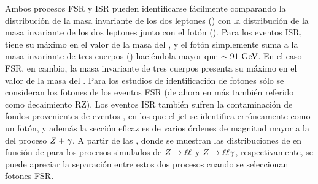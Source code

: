 Ambos procesos \ac{FSR} y \ac{ISR} pueden identificarse fácilmente comparando la distribución de la masa invariante de los dos leptones (\mll) con la distribución de la masa invariante de los dos leptones junto con el fot\'on (\mlly).
Para los eventos \ac{ISR}, \mll tiene su m\'aximo en el valor de la masa del \Zboson, y el fotón simplemente suma a la masa invariante de tres cuerpos (\mlly) haciéndola mayor que \(\sim 91~\text{GeV}\). En el caso \ac{FSR}, en cambio, la masa invariante de tres cuerpos \mlly presenta su m\'aximo en el valor de la masa del \Zboson.
Para los estudios de identificación de fotones sólo se consideran los fotones de los eventos \ac{FSR} (de ahora en m\'as también referido como decaimiento \acf{RZ}). Los eventos \ac{ISR} también sufren la contaminación de fondos provenientes de eventos \Zjets, en los que el jet se identifica erróneamente como un fotón, y adem\'as la sección eficaz \Zjets es de varios \'ordenes de magnitud mayor a la del proceso \(Z+\gamma\). A partir de las \Figs{\ref{fig:pid_ss:event_selection:mll_mlly_distribution:bkg}}{\ref{fig:pid_ss:event_selection:mll_mlly_distribution:signal}}, donde se muestran las distribuciones de \mll en funci\'on de \mlly para los procesos simulados de \(Z\rightarrow\ell\ell\) y \(Z\rightarrow\ell\ell\gamma\), respectivamente, se puede apreciar la separación entre estos dos procesos cuando se seleccionan fotones \ac{FSR}.

